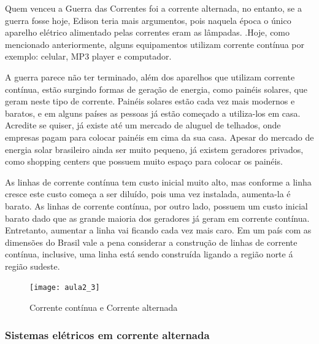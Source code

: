 Quem venceu a Guerra das Correntes foi a corrente alternada, no entanto, se a guerra fosse hoje, Edison teria mais argumentos, pois naquela época o único aparelho elétrico alimentado pelas correntes eram as lâmpadas.
.Hoje, como mencionado anteriormente, alguns equipamentos utilizam corrente contínua por exemplo:
celular, MP3 player e computador.

A guerra parece não ter terminado, além dos aparelhos que utilizam corrente contínua, estão surgindo formas de geração de energia, como painéis solares, que geram neste tipo de corrente. Painéis solares estão cada vez mais modernos e baratos, e em alguns países as pessoas já estão começado a utiliza-los em casa. Acredite se quiser, já existe até um mercado de aluguel de telhados, onde empresas pagam para colocar painéis em cima da sua casa. Apesar do mercado de energia solar brasileiro ainda ser muito pequeno, já existem geradores privados, como shopping centers que possuem muito espaço para colocar os painéis. 

As linhas de corrente contínua tem custo inicial muito alto, mas conforme a linha cresce este custo começa a ser diluído, pois uma vez instalada, aumenta-la é barato. As linhas de corrente contínua, por outro lado, possuem um custo inicial barato dado que as grande maioria dos geradores já geram em corrente contínua. Entretanto, aumentar a linha vai ficando cada vez mais caro. Em um país com as dimensões do Brasil vale a pena considerar a construção de linhas de corrente contínua, inclusive, uma linha está sendo construída ligando a região norte á região sudeste. 

\begin{figure}[H]
\begin{centering}
\texttt{[image: aula2\_3]}\protect\caption{\label{fig:aula2_3} Corrente contínua e Corrente alternada }
\end{centering}

\end{figure}

\subsubsection{Sistemas elétricos em corrente alternada}

